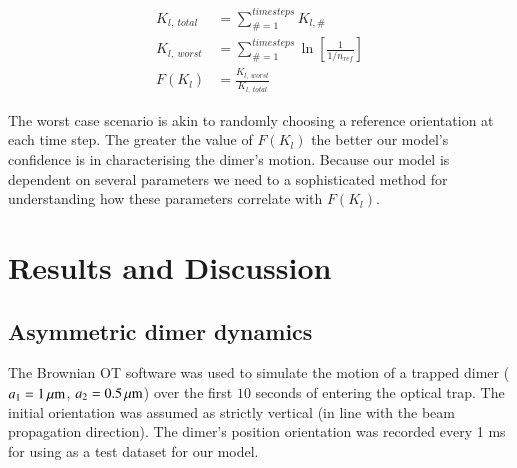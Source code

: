 \documentclass[final,  3p]{elsarticle}
\begin{document}
\begin{align}
K_{l, \ total} &= \sum\limits_{\# =1}^{timesteps} K_{l,\#} \\
K_{l, \ worst} &= \sum\limits_{\#=1}^{timesteps} \ln \left[\frac{1}{1/n_{ref}} \right] \\
F(K_l) &= \frac{K_{l,\ worst}}{K_{l, \ total}}
\end{align}

The worst case scenario is akin to randomly choosing a reference orientation at each time step. The greater the value of $F(K_l)$ the better our model's confidence is in characterising the dimer's motion. Because our model is dependent on several parameters we need to a sophisticated method for understanding how these parameters correlate with $F(K_l)$.

\section{Results and  Discussion}
\label{sec:Discussion}
\subsection{Asymmetric dimer dynamics}
\label{sec:motion}

The Brownian OT software was used to simulate the motion of a trapped dimer ($a_1=1\,{\rm \mu m}$, $a_2=0.5\,{\rm \mu m}$) over the first $10$ seconds of entering the optical trap.  The initial orientation was assumed as strictly vertical (in line with the beam propagation direction). The dimer's position orientation was recorded every 1 ms for using as a test dataset for our model.
\end{document}
